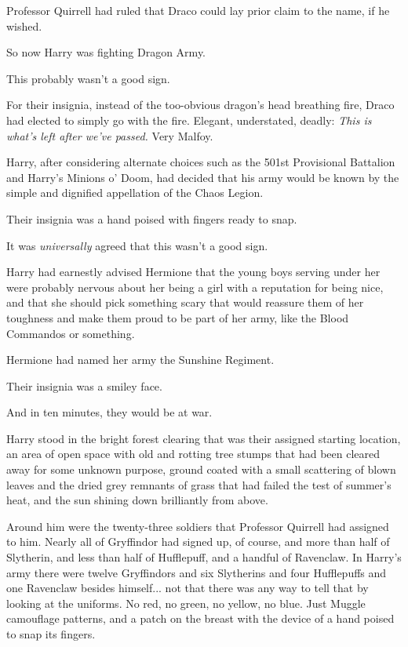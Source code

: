 Professor Quirrell had ruled that Draco could lay prior claim to the
name, if he wished.

So now Harry was fighting Dragon Army.

This probably wasn't a good sign.

For their insignia, instead of the too-obvious dragon's head breathing
fire, Draco had elected to simply go with the fire. Elegant,
understated, deadly: \emph{This is what's left after we've passed.} Very
Malfoy.

Harry, after considering alternate choices such as the 501st Provisional
Battalion and Harry's Minions o' Doom, had decided that his army would
be known by the simple and dignified appellation of the Chaos Legion.

Their insignia was a hand poised with fingers ready to snap.

It was \emph{universally} agreed that this wasn't a good sign.

Harry had earnestly advised Hermione that the young boys serving under
her were probably nervous about her being a girl with a reputation for
being nice, and that she should pick something scary that would reassure
them of her toughness and make them proud to be part of her army, like
the Blood Commandos or something.

Hermione had named her army the Sunshine Regiment.

Their insignia was a smiley face.

And in ten minutes, they would be at war.

Harry stood in the bright forest clearing that was their assigned
starting location, an area of open space with old and rotting tree
stumps that had been cleared away for some unknown purpose, ground
coated with a small scattering of blown leaves and the dried grey
remnants of grass that had failed the test of summer's heat, and the sun
shining down brilliantly from above.

Around him were the twenty-three soldiers that Professor Quirrell had
assigned to him. Nearly all of Gryffindor had signed up, of course, and
more than half of Slytherin, and less than half of Hufflepuff, and a
handful of Ravenclaw. In Harry's army there were twelve Gryffindors and
six Slytherins and four Hufflepuffs and one Ravenclaw besides
himself... not that there was any way to tell that by looking at
the uniforms. No red, no green, no yellow, no blue. Just Muggle
camouflage patterns, and a patch on the breast with the device of a hand
poised to snap its fingers.

